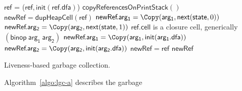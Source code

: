 \documentclass[preprint, 9pt]{sigplanconf}
\begin{document}
\label{sec:live-clo}
  \SetStartEndCondition{ }{}{}%
  \AlgoDontDisplayBlockMarkers\SetAlgoNoEnd\SetAlgoNoLine%
\begin{algorithm}[t]
  \Pro{\Lgc{}}
     {
            {$\mathsf{ref}$ = \Copy($\mathsf{ref}, \mathsf{init}(\mathsf{ref.dfa})$)\;}
            ${\mathsf{copyReferencesOnPrintStack}()}$\;  
     }
        {
             {
               $\mathsf{newRef} = \mathsf{dupHeapCell}(\mathsf{ref})$\;
                  {
                    {
                      $\mathsf{newRef}\!.\mathsf{arg_1}  = \Copy(\mathsf{arg_1}, \mathsf{next}(\mathsf{state}, 0))$\;
                    }
                    {
                      $\mathsf{newRef}\!.\mathsf{arg_2} =  \Copy(\mathsf{arg_2},
                      \mathsf{next}(\mathsf{state} , 1))$\;
                    }    
                  }
               \If
                  {$\mathsf{ref\!.cell}$ is a
                    closure cell, generically  $\mathsf{(binop~arg_1~arg_2)}$}
                   { 
                     $\mathsf{newRef}\!.\mathsf{arg_1} = \Copy(\mathsf{arg_1}, \mathsf{init}(\mathsf{arg_1.dfa}))$\;
                     $\mathsf{newRef}\!.\mathsf{arg_2} = \Copy(\mathsf{arg_2}, \mathsf{init}(\mathsf{arg_2.dfa}))$\;
                   }
             }
             {$\mathsf{newRef = ref}$}
\KwRet $\mathsf{newRef}$\;
        }
        \caption{Liveness-based
          garbage collection.  \label{algo:lgc-a}}
\end{algorithm}
Algorithm~\ref{algo:lgc-a}   describes   the   garbage
\end{document}
